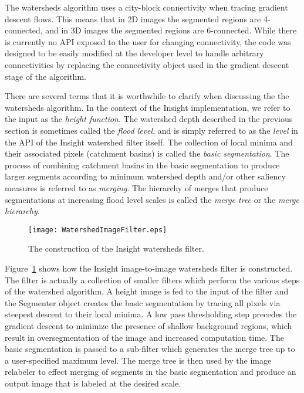 The watersheds algorithm uses a city-block connectivity when tracing gradient
descent flows.  This means that in 2D images the segmented regions are
4-connected, and in 3D images the segmented regions are 6-connected.  While
there is currently no API exposed to the user for changing connectivity, the
code was designed to be easily modified at the developer level to handle
arbitrary connectivities by replacing the connectivity object used in the
gradient descent stage of the algorithm.

There are several terms that it is worthwhile to clarify when discussing the
the watersheds algorithm.  In the context of the Insight
implementation, we refer to the input as the {\em height function}. The
watershed depth described in the previous section is sometimes called the
{\em flood level}, and is simply referred to as the {\em level} in the API of the
Insight watershed filter itself.  The collection of local minima and their
associated pixels (catchment basins) is called the {\em basic segmentation}.
The process of combining catchment basins in the basic segmentation to produce
larger segments according to minimum watershed depth and/or other saliency
measures is referred to as {\em merging}.  The hierarchy of merges that produce
segmentations at increasing flood level scales is called the {\em merge tree} or
the {\em merge hierarchy}.

\begin{figure}
\centering
\texttt{[image: WatershedImageFilter.eps]}
\caption{The construction of the Insight watersheds filter.}
\protect\label{fig:constructionWatersheds}
\end{figure}

Figure~\ref{fig:constructionWatersheds} shows how the Insight image-to-image
watersheds filter is constructed.  The filter is actually a collection of
smaller filters which perform the various steps of the watershed algorithm.  A
height image is fed to the input of the filter and the Segmenter object creates
the basic segmentation by tracing all pixels via steepest descent to their
local minima.  A low pass thresholding step precedes the gradient descent to
minimize the presence of shallow background regions, which result in
oversegmentation of the image and increased computation time.  The basic
segmentation is passed to a sub-filter which generates the merge tree up
to a user-specified maximum level.  The merge tree is then used by the image
relabeler to effect merging of segments in the basic segmentation and
produce an output image that is labeled at the desired scale.

